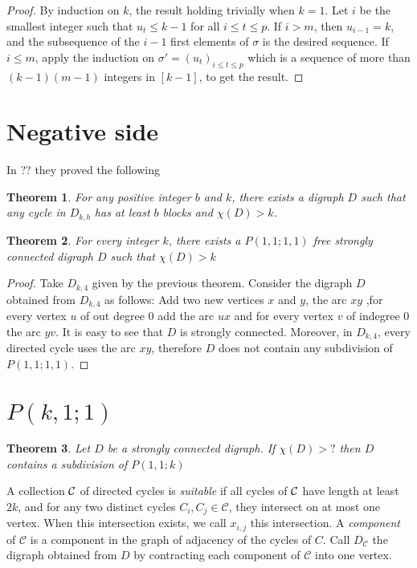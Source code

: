 \documentclass[utf8,10pt]{article}
\theoremstyle{plain}
\newtheorem{theorem}{Theorem}
\theoremstyle{definition}
\theoremstyle{remark}
\begin{document}
\begin{proof}
By induction on $k$, the result holding trivially when $k=1$. 
Let $i$ be the smallest integer such that $u_t\leq k-1$ for all $i\leq t\leq p$.
If $i>m$, then $u_{i-1}=k$, and the subsequence of the $i-1$ first elements of $\sigma$ is the desired sequence.
If $i\leq m$, apply the induction on $\sigma'=(u_t)_{i\leq t\leq p}$ which is a sequence of more than $(k-1)(m-1)$ integers in $[k-1]$, to get the result. 
\end{proof}




\section{Negative side}

In ?? they proved the following 
\begin{theorem}
For any positive integer $b$ and $k$, there exists a digraph $D$ such that any cycle in $D_{k,b}$ has at least $b$ blocks and $\chi(D) > k$.
\end{theorem}

\begin{theorem}
For every integer $k$, there exists a $P(1,1;1,1)$ free strongly connected digraph $D$ such that $\chi(D) >k$ 

\end{theorem}

\begin{proof}
Take $D_{k,4}$ given by the previous theorem. Consider the digraph $D$ obtained from $D_{k,4}$ as follows: Add two new vertices $x$ and $y$, the arc $xy$
,for every vertex $u$ of out degree $0$ add the arc $ux$ and for every vertex $v$ of indegree 0 the arc $yv$. It is easy to see that $D$ is strongly connected.
Moreover, in $D_{k,4}$, every directed cycle uses the arc $xy$, therefore $D$ does not contain any subdivision of $P(1,1;1,1)$. 
\end{proof}




\section{$P(k,1;1)$}

\begin{theorem}\label{th:P11k}
Let $D$ be a strongly connected digraph. If $\chi(D) > ?$ then $D$ contains a subdivision of $P(1,1;k)$
\end{theorem}

A collection ${\cal C}$ of directed cycles is {\it suitable} if all cycles of ${\cal C}$ have length at least $2k$, and for
any two distinct cycles $C_i,C_j\in\mathcal C$, they intersect on at most one vertex. When this intersection exists, we call $x_{i,j}$
this intersection. A {\it component} of $\mathcal{C}$ is a component in the graph of adjacency of the cycles of $C$. Call $D_{\mathcal{C}}$ the digraph
obtained from $D$ by contracting each component of $\mathcal{C}$ into one vertex. 
\end{document}
